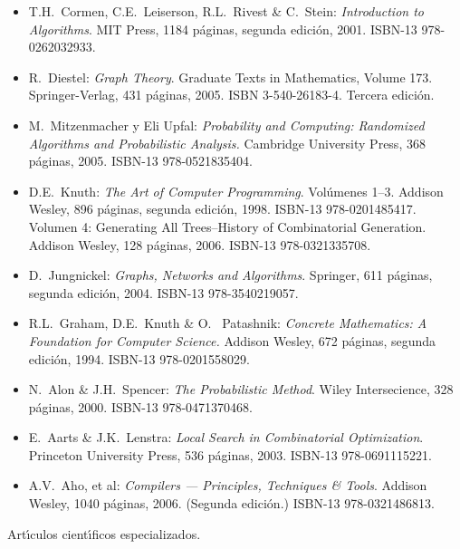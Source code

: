 \begin{itemize}[itemsep=-1pt]
  
\item T.H.\ {\sc Cormen}, C.E.\ {\sc Leiserson}, R.L.\ Rivest \&
  C.\ {\sc Stein}: {\em Introduction to Algorithms}. MIT Press,
  1184 p\'{a}ginas, segunda edici\'{o}n, 2001. ISBN-13
  978-0262032933.
  
\item R.\ {\sc Diestel}: {\em Graph Theory}. Graduate Texts in
  Mathematics, Volume 173. Springer-Verlag, 431 p\'{a}ginas,
  2005. ISBN 3-540-26183-4. Tercera edici\'{o}n.
  
\item M.\ {\sc Mitzenmacher} y Eli {\sc Upfal}: {\em
    Probability and Computing: Randomized Algorithms and
    Probabilistic Analysis.}  Cambridge University Press, 368
  p\'{a}ginas, 2005. ISBN-13 978-0521835404.
  
\item D.E.\ {\sc Knuth}: {\em The Art of Computer
    Programming}. Vol\'{u}menes 1--3. Addison Wesley, 896
  p\'{a}ginas, segunda edici\'{o}n, 1998. ISBN-13
  978-0201485417. Volumen 4: Generating All Trees--History of
  Combinatorial Generation. Addison Wesley, 128 p\'{a}ginas,
  2006. ISBN-13 978-0321335708.
  
\item D.\ {\sc Jungnickel}: {\em Graphs, Networks and
    Algorithms}. Springer, 611 p\'{a}ginas, segunda edici\'{o}n,
  2004. ISBN-13 978-3540219057.
  
\item R.L.\ {\sc Graham}, D.E.\ {\sc Knuth} \& O.\ {\sc
    Patashnik}: {\em Concrete Mathematics: A Foundation for
    Computer
    Science.} Addison Wesley, 672 p\'{a}ginas, segunda edici\'{o}n,
  1994. ISBN-13 978-0201558029.
  
\item N.\ {\sc Alon} \& J.H.\ {\sc Spencer}: {\em The
    Probabilistic Method}. Wiley Intersecience, 328 p\'{a}ginas,
  2000. ISBN-13 978-0471370468.
  
\item E.\ {\sc Aarts} \& J.K.\ {\sc Lenstra}: {\em Local
    Search
    in Combinatorial Optimization}. Princeton University
  Press, 536
  p\'{a}ginas, 2003. ISBN-13 978-0691115221.
  
\item A.V.\ {\sc Aho}, et al: {\em Compilers ---
    Principles,
    Techniques \& Tools}. Addison Wesley, 1040
  p\'{a}ginas, 2006. (Segunda
  edici\'{o}n.) ISBN-13 978-0321486813.
  
\end{itemize}
 
Art\'{\i}culos cient\'{\i}ficos especializados.

\label{final} %


